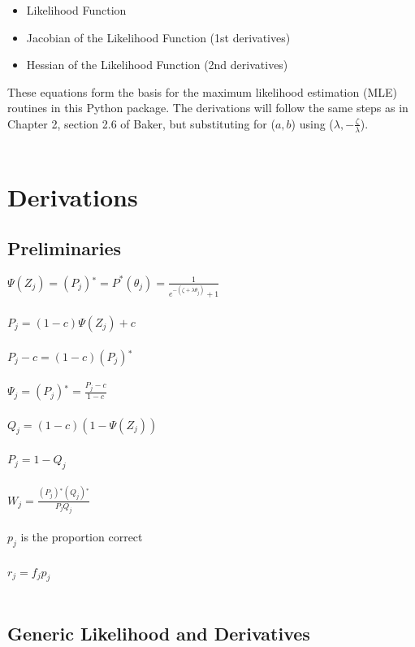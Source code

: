 \documentclass{article}
\begin{document}
\begin{itemize}
  \item Likelihood Function
  \item Jacobian of the Likelihood Function (1st derivatives)
  \item Hessian of the Likelihood Function (2nd derivatives)
\end{itemize}

These equations form the basis for the maximum likelihood estimation (MLE)
routines in this Python package.
The derivations will follow the same steps as in Chapter 2, section 2.6 of Baker,
but substituting for ($a,b$) using ($\lambda,-\frac{\zeta}{\lambda}$).
\\\\
\section{Derivations}
\subsection{Preliminaries}

$\Psi (Z_j)=(P_j){}^*=P^*(\theta _j)=\frac{1}{e^{-(\zeta +\lambda \theta _j)}+1}$
\\\\
$P_j=(1-c) \Psi (Z_j)+c$
\\\\
$P_j-c=(1-c) (P_j){}^*$
\\\\
$\Psi _j=(P_j){}^*=\frac{P_j-c}{1-c}$
\\\\
$Q_j=(1-c) (1-\Psi (Z_j))$
\\\\
$P_j=1-Q_j$
\\\\
$W_j=\frac{(P_j){}^* (Q_j){}^*}{P_j Q_j}$
\\\\
$p_j$ is the proportion correct
\\\\
$r_j = f_j p_j$
\\\\
\subsection{Generic Likelihood and Derivatives}
\end{document}
